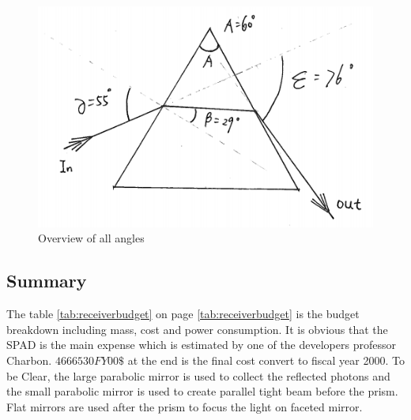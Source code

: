 \begin{figure}[ht!]
\centering
\includegraphics[scale = 0.8]{chapters/img/prism_final.png}
\caption{Overview of all angles}
\label{fig:prism_final}
\end{figure}

\subsection{Summary}
\label{sum}
The table \ref{tab:receiverbudget} on page \ref{tab:receiverbudget} is the budget breakdown including mass, cost and power consumption. It is obvious that the \acs{SPAD} is the main expense which is estimated by one of the developers professor Charbon. $4666530 FY00\$$ at the end is the final cost convert to fiscal year 2000. To be Clear, the large parabolic mirror is used to collect the reflected photons and the small parabolic mirror is used to create parallel tight beam before the prism. Flat mirrors are used after the prism to focus the light on faceted mirror.

